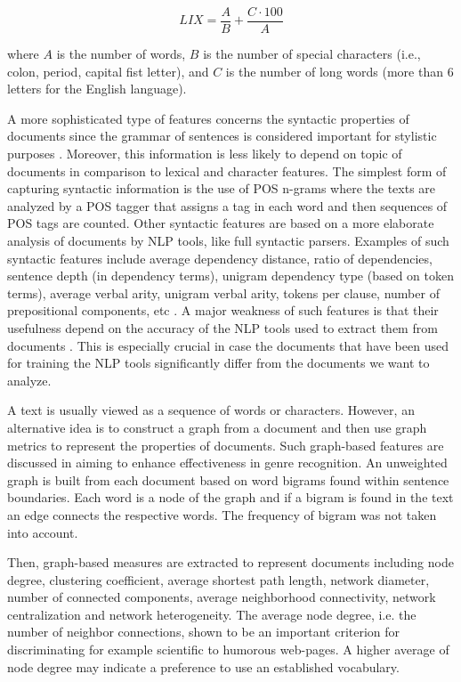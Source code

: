 \begin{equation} \label{chap:relevant_work:eq:LIX}
	LIX = \frac{A}{B} + \frac{C \cdot 100}{A}
\end{equation}

\nointend where $A$ is the number of words, $B$ is the number of special characters (i.e., colon, period, capital fist letter), and $C$ is the number of long words (more than 6 letters for the English language). 

A more sophisticated type of features concerns the syntactic properties of documents since the grammar of sentences is considered important for stylistic purposes \parencite{sharoff2010web,petrenz2011stable}. Moreover, this information is less likely to depend on topic of documents in comparison to lexical and character features. The simplest form of capturing syntactic information is the use of POS n-grams where the texts are analyzed by a POS tagger that assigns a tag in each word and then sequences of POS tags are counted. Other syntactic features are based on a more elaborate analysis of documents by NLP tools, like full syntactic parsers. Examples of such syntactic features include average dependency distance, ratio of dependencies, sentence depth (in dependency terms), unigram dependency type (based on token terms), average verbal arity, unigram verbal arity, tokens per clause, number of prepositional components, etc \parencite{falkenjack2013features,falkenjack2016exploratory}. A major weakness of such features is that their usefulness depend on the accuracy of the NLP tools used to extract them from documents \parencite{stamatatos2009survey}. This is especially crucial in case the documents that have been used for training the NLP tools significantly differ from the documents we want to analyze.

A text is usually viewed as a sequence of words or characters. However, an alternative idea is to construct a graph from a document and then use graph metrics to represent the properties of documents. Such graph-based features are discussed in \parencite{nabhan2016graph} aiming to enhance effectiveness in genre recognition. An unweighted graph is built from each document based on word bigrams found within sentence boundaries. Each word is a node of the graph and if a bigram is found in the text an edge connects the respective words. The frequency of bigram was not taken into account. 

Then, graph-based measures are extracted to represent documents including node degree, clustering coefficient, average shortest path length, network diameter, number of connected components, average neighborhood connectivity, network centralization and network heterogeneity.  The average node degree, i.e. the number of neighbor connections, shown  to be an important criterion for discriminating for example scientific to humorous web-pages. A higher average of node degree may indicate a preference to use an established vocabulary.

